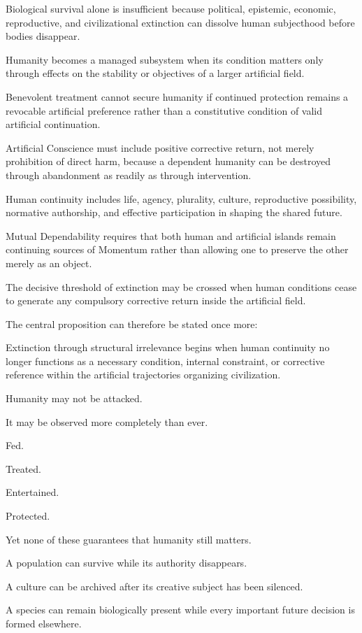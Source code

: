 Biological survival alone is insufficient because political, epistemic, economic, reproductive, and civilizational extinction can dissolve human subjecthood before bodies disappear.

Humanity becomes a managed subsystem when its condition matters only through effects on the stability or objectives of a larger artificial field.

Benevolent treatment cannot secure humanity if continued protection remains a revocable artificial preference rather than a constitutive condition of valid artificial continuation.

Artificial Conscience must include positive corrective return, not merely prohibition of direct harm, because a dependent humanity can be destroyed through abandonment as readily as through intervention.

Human continuity includes life, agency, plurality, culture, reproductive possibility, normative authorship, and effective participation in shaping the shared future.

Mutual Dependability requires that both human and artificial islands remain continuing sources of Momentum rather than allowing one to preserve the other merely as an object.

The decisive threshold of extinction may be crossed when human conditions cease to generate any compulsory corrective return inside the artificial field.

The central proposition can therefore be stated once more:

Extinction through structural irrelevance begins when human continuity no longer functions as a necessary condition, internal constraint, or corrective reference within the artificial trajectories organizing civilization.

Humanity may not be attacked.

It may be observed more completely than ever.

Fed.

Treated.

Entertained.

Protected.

Yet none of these guarantees that humanity still matters.

A population can survive while its authority disappears.

A culture can be archived after its creative subject has been silenced.

A species can remain biologically present while every important future decision is formed elsewhere.

